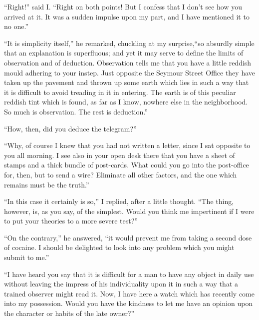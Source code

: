 \documentclass[12pt,english,oneside]{book}
\begin{document}
{}``Right!'' said I. {}``Right on both points! But I confess that
I don't see how you arrived at it. It was a sudden impulse upon my
part, and I have mentioned it to no one.''

{}``It is simplicity itself,'' he remarked, chuckling at my surprise,\mdsh{---}``so
absurdly simple that an explanation is superfluous; and yet it may
serve to define the limits of observation and of deduction. Observation
tells me that you have a little reddish mould adhering to your instep.
Just opposite the Seymour Street Office they have taken up the pavement
and thrown up some earth which lies in such a way that it is difficult
to avoid treading in it in entering. The earth is of this peculiar
reddish tint which is found, as far as I know, nowhere else in the
neighborhood. So much is observation. The rest is deduction.''

{}``How, then, did you deduce the telegram?''

{}``Why, of course I knew that you had not written a letter, since
I sat opposite to you all morning. I see also in your open desk there
that you have a sheet of stamps and a thick bundle of post-cards.
What could you go into the post-office for, then, but to send a wire?
Eliminate all other factors, and the one which remains must be the
truth.''

{}``In this case it certainly is so,'' I replied, after a little
thought. {}``The thing, however, is, as you say, of the simplest.
Would you think me impertinent if I were to put your theories to a
more severe test?''

{}``On the contrary,'' he answered, {}``it would prevent me from
taking a second dose of cocaine. I should be delighted to look into
any problem which you might submit to me.''

{}``I have heard you say that it is difficult for a man to have any
object in daily use without leaving the impress of his individuality
upon it in such a way that a trained observer might read it. Now,
I have here a watch which has recently come into my possession. Would
you have the kindness to let me have an opinion upon the character
or habits of the late owner?''
\end{document}
